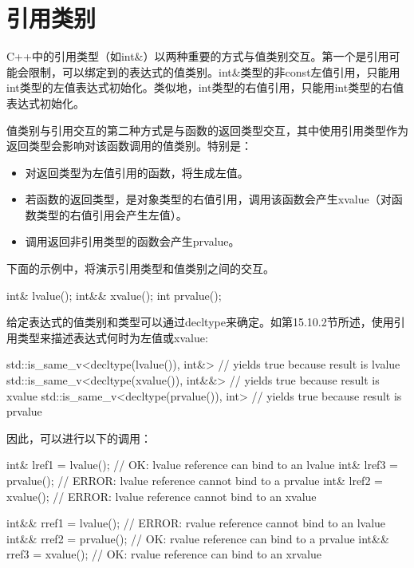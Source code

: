 \section{引用类别}
C++中的引用类型（如int\&）以两种重要的方式与值类别交互。第一个是引用可能会限制，可以绑定到的表达式的值类别。int\&类型的非const左值引用，只能用int类型的左值表达式初始化。类似地，int类型的右值引用，只能用int类型的右值表达式初始化。

值类别与引用交互的第二种方式是与函数的返回类型交互，其中使用引用类型作为返回类型会影响对该函数调用的值类别。特别是：

\begin{itemize}
\item 
对返回类型为左值引用的函数，将生成左值。

\item 
若函数的返回类型，是对象类型的右值引用，调用该函数会产生xvalue（对函数类型的右值引用会产生左值）。

\item 
调用返回非引用类型的函数会产生prvalue。
\end{itemize}

下面的示例中，将演示引用类型和值类别之间的交互。

\begin{cpp}
int& lvalue();
int&& xvalue();
int prvalue();
\end{cpp}

给定表达式的值类别和类型可以通过decltype来确定。如第15.10.2节所述，使用引用类型来描述表达式何时为左值或xvalue:

\begin{cpp}
std::is_same_v<decltype(lvalue()), int&> // yields true because result is lvalue
std::is_same_v<decltype(xvalue()), int&&> // yields true because result is xvalue
std::is_same_v<decltype(prvalue()), int> // yields true because result is prvalue
\end{cpp}

因此，可以进行以下的调用：

\begin{cpp}
int& lref1 = lvalue(); // OK: lvalue reference can bind to an lvalue
int& lref3 = prvalue(); // ERROR: lvalue reference cannot bind to a prvalue
int& lref2 = xvalue(); // ERROR: lvalue reference cannot bind to an xvalue

int&& rref1 = lvalue(); // ERROR: rvalue reference cannot bind to an lvalue
int&& rref2 = prvalue(); // OK: rvalue reference can bind to a prvalue
int&& rref3 = xvalue(); // OK: rvalue reference can bind to an xrvalue
\end{cpp}
















